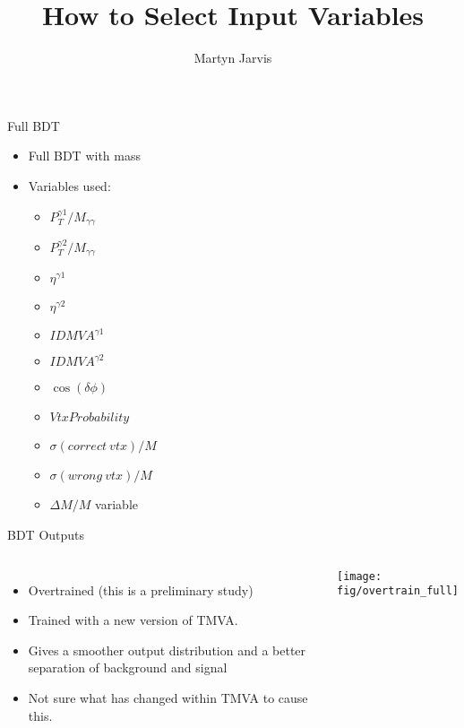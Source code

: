 \documentclass[t, 8pt]{beamer}
\author{Martyn Jarvis}
\title[Input Variables]{How to Select Input Variables}
\begin{document}


\begin{frame}{Full BDT}
  \begin{itemize}  
  \item Full BDT with mass
  \item Variables used:
  \begin{itemize}  
    \item $P_T^{\gamma 1} / M_{\gamma \gamma}$
    \item $P_T^{\gamma 2} / M_{\gamma \gamma}$
    \item $\eta^{\gamma 1}$
    \item $\eta^{\gamma 2}$
    \item $ID MVA^{\gamma 1}$
    \item $ID MVA^{\gamma 2}$
    \item $\cos( \delta \phi )$
    \item $Vtx Probability$
    \item $\sigma(correct ~vtx)/M$
    \item $\sigma(wrong ~vtx)/M$
    \item \alert{$\Delta M/M$ variable}
  \end{itemize}
  \end{itemize}
\end{frame}

\begin{frame}{BDT Outputs}
  \begin{columns}[c]
  \begin{itemize}
    \item Overtrained (this is a preliminary study)
    \item Trained with a new version of TMVA.
    \item Gives a smoother output distribution and a better separation of
    background and signal
    \item Not sure what has changed within TMVA to cause this.
  \end{itemize}
    \texttt{[image: fig/overtrain\_full]}
  \end{columns}
\end{frame}
\end{document}
